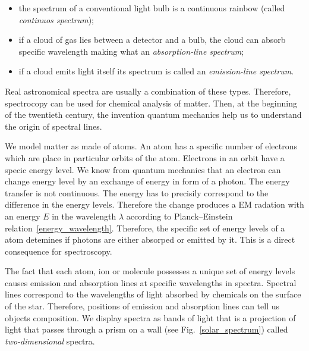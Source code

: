 \begin{itemize}
	\item the spectrum of a conventional light bulb is a continuous rainbow (called \textit{continuos spectrum});
	\item if a cloud of gas lies between a detector and a bulb,
		the cloud can absorb specific wavelength making what an \textit{absorption-line spectrum};
	\item if a cloud emits light itself its spectrum is called an \textit{emission-line spectrum}.
\end{itemize}

Real astronomical spectra are usually a combination of these types.
Therefore, spectrocopy can be used for chemical analysis of matter.
Then, at the beginning of the twentieth century,
the invention quantum mechanics help us to understand the origin of spectral lines.

We model matter as made of atoms.
An atom has a specific number of electrons
which are place in particular orbits of the atom.
Electrons in an orbit have a specic energy level.
We know from quantum mechanics that an electron can change energy level by an exchange of energy in form of a photon.
The energy transfer is not continuous.
The energy has to precisily correspond to the difference in the energy levels.
Therefore the change produces a EM radation with an energy \(E\) in the wavelength \(\lambda\)
according to Planck--Einstein relation~\ref{energy_wavelength}.
Therefore, the specific set of energy levels of a atom detemines
if photons are either absorped or emitted by it.
This is a direct consequence for spectroscopy.~\cite{cochard2018}

The fact that each atom,
ion or molecule possesses a unique set of energy levels
causes emission and absorption lines at specific wavelengths in spectra.
Spectral lines correspond to the wavelengths of light absorbed by chemicals on the surface of the star.
Therefore, positions of emission and absorption lines can tell us objects composition.
We display spectra as bands of light that is a projection of light
that passes through a prism on a wall (see Fig.~\ref{solar_spectrum})
called \textit{two-dimensional} spectra.~\cite{cochard2018}

